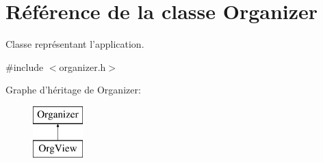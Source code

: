\hypertarget{class_organizer}{\section{Référence de la classe Organizer}
\label{class_organizer}
}


Classe représentant l'application.  




{\ttfamily \#include $<$organizer.\-h$>$}

Graphe d'héritage de Organizer\-:\begin{figure}[H]
\begin{center}
\leavevmode
\includegraphics[height=2.000000cm]{class_organizer}
\end{center}
\end{figure}
